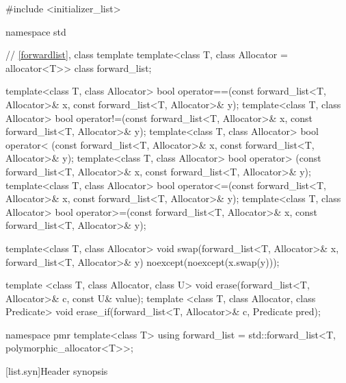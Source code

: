 \begin{codeblock}
#include <initializer_list>

namespace std {
  // \ref{forwardlist}, class template 
  template<class T, class Allocator = allocator<T>> class forward_list;

  template<class T, class Allocator>
    bool operator==(const forward_list<T, Allocator>& x, const forward_list<T, Allocator>& y);
  template<class T, class Allocator>
    bool operator!=(const forward_list<T, Allocator>& x, const forward_list<T, Allocator>& y);
  template<class T, class Allocator>
    bool operator< (const forward_list<T, Allocator>& x, const forward_list<T, Allocator>& y);
  template<class T, class Allocator>
    bool operator> (const forward_list<T, Allocator>& x, const forward_list<T, Allocator>& y);
  template<class T, class Allocator>
    bool operator<=(const forward_list<T, Allocator>& x, const forward_list<T, Allocator>& y);
  template<class T, class Allocator>
    bool operator>=(const forward_list<T, Allocator>& x, const forward_list<T, Allocator>& y);

  template<class T, class Allocator>
    void swap(forward_list<T, Allocator>& x, forward_list<T, Allocator>& y)
      noexcept(noexcept(x.swap(y)));

  template <class T, class Allocator, class U>
    void erase(forward_list<T, Allocator>& c, const U& value);
  template <class T, class Allocator, class Predicate>
    void erase_if(forward_list<T, Allocator>& c, Predicate pred);

  namespace pmr {
    template<class T>
      using forward_list = std::forward_list<T, polymorphic_allocator<T>>;
  }
}
\end{codeblock}

[list.syn]{Header  synopsis}

%


